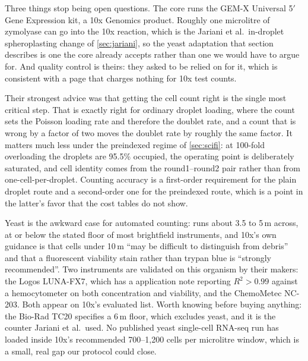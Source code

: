  Three things stop being open questions. The core runs
the GEM-X Universal 5$'$ Gene Expression kit, a 10x Genomics product. Roughly one
microlitre of zymolyase can go into the 10x reaction, which is the Jariani et
al.\ in-droplet spheroplasting change of \cref{sec:jariani}, so the yeast
adaptation that section describes is one the core already accepts rather than one
we would have to argue for. And quality control is theirs: they asked to be
relied on for it, which is consistent with a page that charges nothing for 10x
test counts.

 Their strongest
advice was that getting the cell count right is the single most critical step.
That is exactly right for ordinary droplet loading, where the count sets the
Poisson loading rate and therefore the doublet rate, and a count that is wrong by
a factor of two moves the doublet rate by roughly the same factor. It matters
much less under the preindexed regime of \cref{sec:scifi}: at 100-fold
overloading the droplets are 95.5\% occupied, the operating point is deliberately
saturated, and cell identity comes from the round1--round2 pair rather than from
one-cell-per-droplet. Counting accuracy is a first-order requirement for the
plain droplet route and a second-order one for the preindexed route, which is a
point in the latter's favor that the cost tables do not show.

 Yeast is the awkward
case for automated counting:  runs about 3.5 to
5\,\textmu m
across, at or below the stated floor of most brightfield instruments, and 10x's
own guidance is that cells under 10\,\textmu m ``may be difficult to distinguish
from debris'' and that a fluorescent viability stain rather than trypan blue is
``strongly recommended''. Two instruments are validated on
this organism by their makers: the Logos LUNA-FX7, which has a
 application note reporting $R^{2}>0.99$ against a
hemocytometer on both concentration and viability, and the ChemoMetec
NC-203.
Both appear on 10x's evaluated list. Worth knowing before buying anything: the
Bio-Rad TC20 specifies a 6\,\textmu m floor,
which excludes yeast, and it is the
counter Jariani et al.\ used. No published yeast single-cell RNA-seq run has
loaded inside 10x's recommended 700--1{,}200 cells per microlitre
window, which
is a small, real gap our protocol could close.

